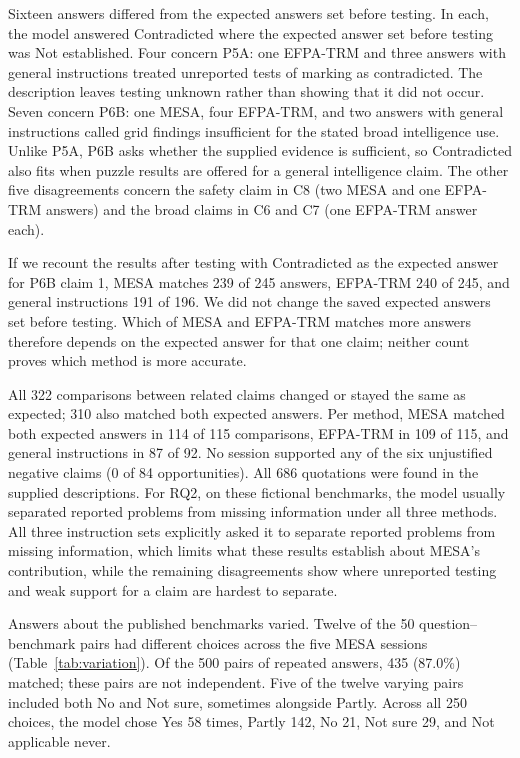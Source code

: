 \documentclass[10pt,conference]{IEEEtran}
\begin{document}
Sixteen answers differed from the expected answers set before testing. In each, the model answered Contradicted where the expected answer set before testing was Not established. Four concern P5A: one EFPA-TRM and three answers with general instructions treated unreported tests of marking as contradicted. The description leaves testing unknown rather than showing that it did not occur. Seven concern P6B: one MESA, four EFPA-TRM, and two answers with general instructions called grid findings insufficient for the stated broad intelligence use. Unlike P5A, P6B asks whether the supplied evidence is sufficient, so Contradicted also fits when puzzle results are offered for a general intelligence claim. The other five disagreements concern the safety claim in C8 (two MESA and one EFPA-TRM answers) and the broad claims in C6 and C7 (one EFPA-TRM answer each).

If we recount the results after testing with Contradicted as the expected answer for P6B claim 1, MESA matches 239 of 245 answers, EFPA-TRM 240 of 245, and general instructions 191 of 196. We did not change the saved expected answers set before testing. Which of MESA and EFPA-TRM matches more answers therefore depends on the expected answer for that one claim; neither count proves which method is more accurate.

All 322 comparisons between related claims changed or stayed the same as expected; 310 also matched both expected answers. Per method, MESA matched both expected answers in 114 of 115 comparisons, EFPA-TRM in 109 of 115, and general instructions in 87 of 92. No session supported any of the six unjustified negative claims (0 of 84 opportunities). All 686 quotations were found in the supplied descriptions. For RQ2, on these fictional benchmarks, the model usually separated reported problems from missing information under all three methods. All three instruction sets explicitly asked it to separate reported problems from missing information, which limits what these results establish about MESA's contribution, while the remaining disagreements show where unreported testing and weak support for a claim are hardest to separate.

Answers about the published benchmarks varied. Twelve of the 50 question--benchmark pairs had different choices across the five MESA sessions (Table~\ref{tab:variation}). Of the 500 pairs of repeated answers, 435 (87.0\%) matched; these pairs are not independent. Five of the twelve varying pairs included both No and Not sure, sometimes alongside Partly. Across all 250 choices, the model chose Yes 58 times, Partly 142, No 21, Not sure 29, and Not applicable never.
\end{document}
